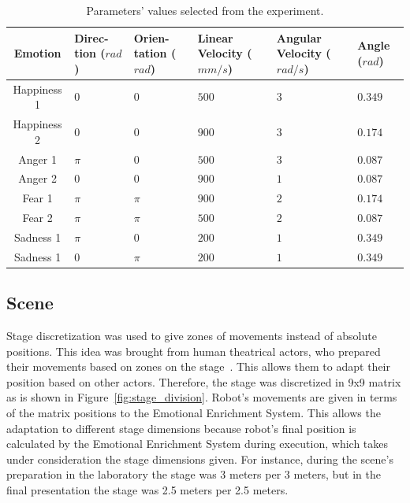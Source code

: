 \begin{table}[h]
\centering
\small
\caption{Parameters' values selected from the experiment.}
		\label{table:selected_fourth}
		\begin{tabular}{|c|p{0.9 cm}|p{0.9 cm}|p{0.9 cm}|p{1.05 cm}|p{0.9 cm}|}
			\hline
\textbf{Emotion}&\textbf{Direc-tion  ($rad$)} & \textbf{Orien-tation ($rad$)} & \textbf{Linear Velocity ($mm/s$) } & \textbf{Angular Velocity ($rad/s$) } & \textbf{Angle ($rad$)} \\
			\hline
			Happiness 1&$0$&$0$&$500$&$3$&$0.349$\\
			\hline
			Happiness 2&$0$&$0$&$900$&$3$&$0.174$\\
			\hline
			Anger 1&$\pi$&$0$&$500$&$3$&$0.087$\\
			\hline
			Anger 2&$0$&$0$&$900$&$1$&$0.087$\\
			\hline
			Fear 1&$\pi$&$\pi$&$900$&$2$&$0.174$\\
			\hline
			Fear 2&$\pi$&$\pi$&$500$&$2$&$0.087$\\
			\hline
			Sadness 1&$\pi$&$0$&$200$&$1$&$0.349$\\
			\hline
			Sadness 1&$0$&$\pi$&$200$&$1$&$0.349$\\
			\hline
			\end{tabular}
\end{table}


\subsection{Scene}

Stage discretization was used to give zones of movements instead of absolute positions. This idea was brought from human theatrical actors, who prepared their movements based on zones on the stage~\cite{wilson2009theatre}. This allows them to adapt their position based on other actors. Therefore, the stage was discretized in 9x9 matrix as is shown in Figure~\ref{fig:stage_division}. Robot's movements are given in terms of the matrix positions to the Emotional Enrichment System. This allows the adaptation to different stage dimensions because robot's final position is calculated by the Emotional Enrichment System during execution, which takes under consideration the stage dimensions given. For instance, during the scene's preparation in the laboratory the stage was 3 meters per 3 meters, but in the final presentation the stage was 2.5 meters per 2.5 meters.

